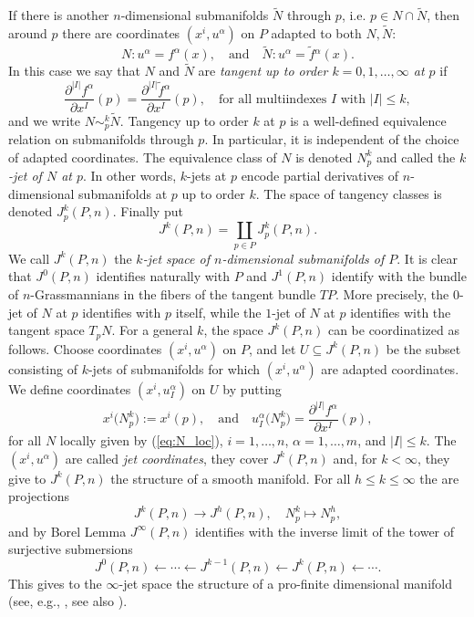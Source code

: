 \documentclass{conm-p-l}
\theoremstyle{definition}
\theoremstyle{remark}
\numberwithin{equation}{section}
\begin{document}
If there is another $n$-dimensional submanifolds $\tilde N$ through $p$, i.e.{} $p \in N \cap \tilde N$, then around $p$ there are coordinates $(x^i, u^\alpha)$ on $P$ adapted to both $N, \tilde N$:
\[
N : u^\alpha = f^\alpha (x), \quad \text{and} \quad \tilde N : u^\alpha = \tilde f{}^\alpha (x) .
\]
In this case we say that $N$ and $\tilde N$ are \emph{tangent up to order $k = 0, 1, \ldots, \infty$ at $p$} if
\[
\frac{\partial^{|I|} f^\alpha}{\partial x^I} (p) = \frac{\partial^{|I|} \tilde f{}^\alpha}{\partial x^I} (p),\quad \text{for all multiindexes $I$ with $|I| \leq k$},
\]
and we write $N \sim_p^k \tilde N$. Tangency up to order $k$ at $p$ is a well-defined equivalence relation on submanifolds through $p$. In particular, it is independent of the choice of adapted coordinates. The equivalence class of $N$ is denoted $N^k_p$ and called the \emph{$k$-jet of $N$ at $p$}.   In other words,   $k$-jets at $p$ encode partial derivatives of $n$-dimensional submanifolds at $p$ up to order $k$. The space of tangency classes is denoted $J^k_p (P, n)$. Finally put
\[
J^k (P, n) = \coprod_{p \in P} J^k_p (P,n).
\] 
We call $J^k (P, n)$ the \emph{$k$-jet space of $n$-dimensional submanifolds of $P$}. It is clear that $J^0 (P, n)$ identifies naturally with $P$ and $J^1 (P, n)$ identify with the bundle of $n$-Grassmannians in the fibers of the tangent bundle $TP$. More precisely, the $0$-jet of $N$ at $p$ identifies with $p$ itself, while the $1$-jet of $N$ at $p$ identifies with the tangent space $T_p N$. For a general $k$, the space $J^k (P, n)$ can be coordinatized as follows. Choose coordinates $(x^i, u^\alpha)$ on $P$, and let $U \subseteq J^k (P, n)$ be the subset consisting of $k$-jets of submanifolds for which $(x^i, u^\alpha)$ are adapted coordinates. We define coordinates  $(x^i, u^\alpha_I)$ on $U$ by putting
\[
x^i \big( N^k_p \big) := x^i (p), \quad \text{and} \quad u^\alpha_I \big(N^k_p\big) = \frac{\partial^{|I|} f^\alpha}{\partial x^I} (p),
\]
for all $N$ locally given by (\ref{eq:N_loc}), $i = 1, \ldots, n$, $\alpha = 1, \ldots, m$, and $|I| \leq k$. The $(x^i, u^\alpha)$ are called \emph{jet coordinates}, they cover $J^k (P, n)$ and, for $k < \infty$, they give to $J^k (P, n)$ the structure of a smooth manifold. For all $h \leq k \leq \infty$ the are projections
\[
J^k (P, n) \to J^h (P, n), \quad N^k_p \mapsto N^h_p,
\]
and by Borel Lemma $J^\infty (P, n)$ identifies with the inverse limit of the tower of surjective submersions
\[
J^0 (P, n)  \longleftarrow \cdots \longleftarrow J^{k-1} (P, n) \longleftarrow J^k (P,n) \longleftarrow \cdots.
\]
This gives to the $\infty$-jet space the structure of a pro-finite dimensional manifold (see, e.g., \cite{b...99,v01}, see also \cite{g17}). 
\end{document}
